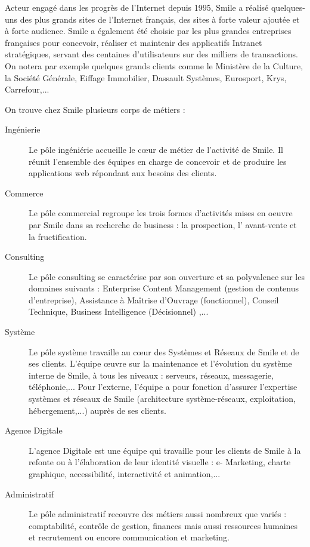 \documentclass[a4paper,11pt,twoside]{report}
\begin{document}
  Acteur engagé dans les progrès de l’Internet depuis 1995, Smile a réalisé quelques-uns des plus grands sites de l'Internet français, des sites à forte valeur ajoutée et à forte audience. Smile a également été choisie par les plus grandes entreprises françaises pour concevoir, réaliser et maintenir des applicatifs Intranet stratégiques, servant des centaines d'utilisateurs sur des milliers de transactions. On notera par exemple quelques grands clients comme le Ministère de la Culture, la Société Générale, Eiffage Immobilier, Dassault Systèmes, Eurosport, Krys, Carrefour,...\newline
  
  On trouve chez Smile plusieurs corps de métiers :\newline
  \begin{description}

    \item[Ingénierie] Le pôle ingéniérie accueille le cœur de métier de l’activité de Smile. Il réunit l’ensemble des équipes en charge de concevoir et de produire les applications web répondant aux besoins des clients.
    \item[Commerce] Le pôle commercial regroupe les trois formes d’activités mises en oeuvre par Smile dans sa recherche de business : la prospection, l’ avant-vente et la fructification.
    \item[Consulting] Le pôle consulting se caractérise par son ouverture et sa polyvalence sur les domaines suivants : Enterprise Content Management (gestion de contenus d’entreprise), Assistance à Maîtrise d’Ouvrage (fonctionnel), Conseil Technique, Business Intelligence (Décisionnel) ,...
    \item[Système] Le pôle système travaille au cœur des Systèmes et Réseaux de Smile et de ses clients. L’équipe œuvre sur la maintenance et l’évolution du système interne de Smile, à tous les niveaux : serveurs, réseaux, messagerie, téléphonie,... Pour l’externe, l’équipe a pour fonction d’assurer l’expertise systèmes et réseaux de Smile (architecture système-réseaux, exploitation, hébergement,...) auprès de ses clients.
    \item[Agence Digitale] L'agence Digitale est une équipe qui travaille pour les clients de Smile à la refonte ou à l’élaboration de leur identité visuelle : e- Marketing, charte graphique, accessibilité, interactivité et animation,... 
    \item[Administratif] Le pôle administratif recouvre des métiers aussi nombreux que variés : comptabilité, contrôle de gestion, finances mais aussi ressources humaines et recrutement ou encore communication et marketing.
    \newline
  \end{description}
  
\end{document}
